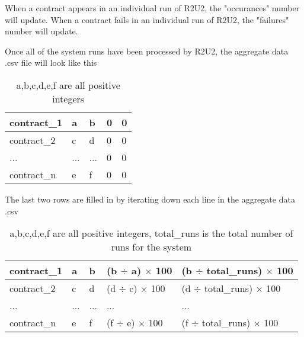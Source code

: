 \documentclass{article}
\begin{document}
    When a contract appears in an individual run of R2U2, the "occurances" number will update.
    When a contract fails in an individual run of R2U2, the "failures" number will update.

    Once all of the system runs have been processed by R2U2, the aggregate data .csv file will look like this\\
    
    \begin{table}[h!]
        \center
        \begin{tabular}{|l|l|l|l|l|}
        \hline
        contract\_1 & a          & b        & 0                   & 0                \\ \hline
        contract\_2 & c          & d        & 0                   & 0                \\ \hline
        ...         & ...        & ...      & 0                   & 0                \\ \hline
        contract\_n & e          & f        & 0                   & 0                \\ \hline
        \end{tabular}
        \caption{a,b,c,d,e,f are all positive integers}
    \end{table}

    The last two rows are filled in by iterating down each line in the aggregate data .csv
    \begin{table}[h!]
        \centering
        \begin{tabular}{|l|l|l|l|l|}
            \hline
            contract\_1 & a          & b        & (b $\div$ a) $\times$ 100 & (b $\div$ total\_runs) $\times$ 100 \\ \hline
            contract\_2 & c          & d        & (d $\div$ c) $\times$ 100 & (d $\div$ total\_runs) $\times$ 100 \\ \hline
            ...         & ...        & ...      & ...                                                 & ...                                                  \\ \hline
            contract\_n & e          & f        & (f $\div$ e) $\times$ 100 & (f $\div$ total\_runs) $\times$ 100 \\ \hline
        \end{tabular}
        \caption{a,b,c,d,e,f are all positive integers, total\_runs is the total number of runs for the system}
        \end{table}
\end{document}
